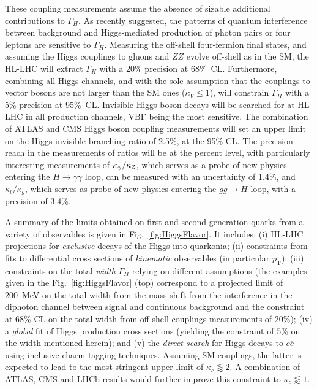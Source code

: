\documentclass[../report.tex]{subfiles}
\begin{document}
These coupling measurements assume the absence of sizable additional contributions to $\Gamma_H$. As recently suggested, the patterns of quantum interference between background and Higgs-mediated production of photon pairs or four leptons are sensitive to $\Gamma_H$. Measuring the off-shell four-fermion final states, and assuming the Higgs couplings to gluons and $ZZ$ evolve off-shell as in the SM, the HL-LHC will extract $\Gamma_H$ with a 20\% precision at 68\%~CL.
Furthermore, combining all Higgs channels, and with the sole assumption that the couplings to vector bosons are not  larger than the SM ones ($\kappa_V\le 1$), will constrain $\Gamma_H$ with a 5\% precision at 95\%~CL. Invisible Higgs boson decays will be searched for at HL-LHC in all production channels, VBF being the most sensitive. The combination of ATLAS and CMS Higgs boson coupling measurements will set an upper limit on the Higgs invisible branching ratio of 2.5\%, at the 95\% CL.  The precision reach in the measurements of ratios will be at the percent level, with particularly interesting measurements of $\kappa_{\gamma}/\kappa_{\rm Z}$, which serves as a probe of new physics entering the $H \rightarrow \gamma\gamma$ loop, can be measured with an uncertainty of 1.4\%, and $\kappa_{t}/\kappa_{g}$, which serves as probe of new physics entering the $gg \rightarrow H$ loop, with a precision of 3.4\%.

A summary of the limits obtained on  first and second generation quarks from a variety of observables is given in Fig.~\ref{fig:HiggsFlavor}. It includes: (i) HL-LHC projections for {\it exclusive} decays of the Higgs into quarkonia; (ii) constraints from fits to differential cross sections of {\it kinematic} observables (in particular $p_\mathrm{T}$); (iii) constraints on the total {\it width} $\Gamma_H$ relying on different assumptions (the examples given in the Fig.~\ref{fig:HiggsFlavor} (top) correspond to a projected limit of 200~MeV on the total width from the mass shift from the interference in the diphoton channel between signal and continuous background and the constraint at 68\% CL on the total width from off-shell couplings measurements of 20\%); (iv) a {\it global} fit of Higgs production cross sections (yielding the constraint of 5\% on the width mentioned herein); and (v) the {\it direct search} for Higgs decays to $c\overline{c}$ using inclusive charm tagging techniques. Assuming SM couplings, the latter is expected to lead to the most stringent upper limit of $\kappa_c \lessapprox 2$. A combination of ATLAS, CMS and LHCb results would further improve this constraint to $\kappa_c \lessapprox 1$.
\end{document}

